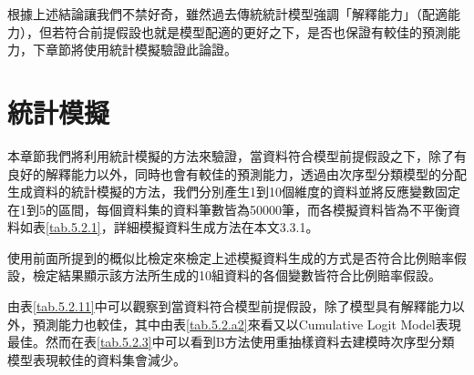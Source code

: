 	根據上述結論讓我們不禁好奇，雖然過去傳統統計模型強調「解釋能力」（配適能力），但若符合前提假設也就是模型配適的更好之下，是否也保證有較佳的預測能力，下章節將使用統計模擬驗證此論證。


\section{統計模擬}

	本章節我們將利用統計模擬的方法來驗證，當資料符合模型前提假設之下，除了有良好的解釋能力以外，同時也會有較佳的預測能力，透過由次序型分類模型的分配生成資料的統計模擬的方法，我們分別產生1到10個維度的資料並將反應變數固定在1到5的區間，每個資料集的資料筆數皆為50000筆，而各模擬資料皆為不平衡資料如表\ref{tab.5.2.1}，詳細模擬資料生成方法在本文3.3.1。

	使用前面所提到的概似比檢定來檢定上述模擬資料生成的方式是否符合比例賠率假設，檢定結果顯示該方法所生成的10組資料的各個變數皆符合比例賠率假設。

\begin{table}[H]
	\small
    \centering
    \extrarowheight=5pt
    \caption{模擬資料目標變數樣態}\label{tab.5.2.1}
\end{table}


	由表\ref{tab.5.2.11}中可以觀察到當資料符合模型前提假設，除了模型具有解釋能力以外，預測能力也較佳，其中由表\ref{tab.5.2.a2}來看又以Cumulative Logit Model表現最佳。然而在表\ref{tab.5.2.3}中可以看到B方法使用重抽樣資料去建模時次序型分類模型表現較佳的資料集會減少。
	
